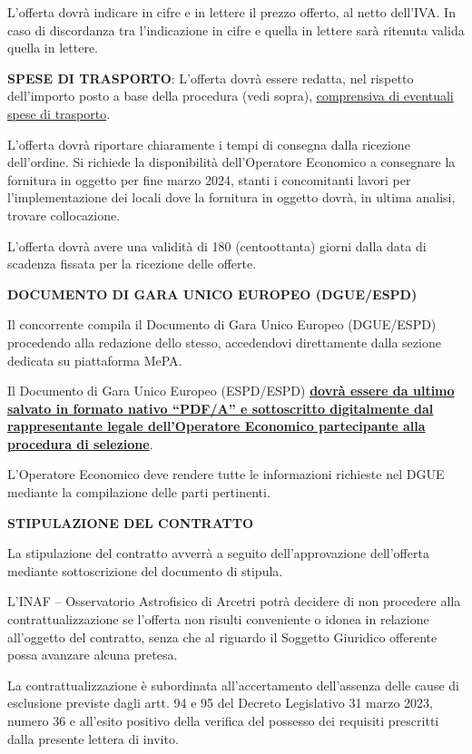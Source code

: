 \documentclass[a4paper,12pt]{letter}
\begin{document}
L'offerta dovrà indicare in cifre e in lettere il prezzo offerto, al netto dell’IVA. In caso di discordanza tra l’indicazione in cifre e quella in lettere sarà ritenuta valida quella in lettere.

\textbf{SPESE DI TRASPORTO}: L’offerta dovrà essere redatta, nel rispetto dell’importo posto a base della procedura (vedi sopra), \underline{comprensiva di eventuali spese di trasporto}.

L’offerta dovrà riportare chiaramente i tempi di consegna dalla ricezione dell’ordine. Si richiede la disponibilità dell’Operatore Economico a consegnare la fornitura in oggetto per fine marzo 2024, stanti i concomitanti lavori per l’implementazione dei locali dove la fornitura in oggetto dovrà, in ultima analisi, trovare collocazione.

L’offerta dovrà avere una validità di 180 (centoottanta) giorni dalla data di scadenza fissata per la ricezione delle offerte.

\textbf{DOCUMENTO DI GARA UNICO EUROPEO (DGUE/ESPD)}

Il concorrente compila il Documento di Gara Unico Europeo (DGUE/ESPD) procedendo alla redazione dello stesso, accedendovi direttamente dalla sezione dedicata su piattaforma MePA. 

Il Documento di Gara Unico Europeo (ESPD/ESPD) \textbf{\underline{dovrà essere da ultimo salvato in formato nativo “PDF/A” e sottoscritto digitalmente dal rappresentante legale dell’Operatore Economico partecipante alla procedura di selezione}}.

L’Operatore Economico deve rendere tutte le informazioni richieste nel DGUE mediante la compilazione delle parti pertinenti.

\textbf{STIPULAZIONE DEL CONTRATTO}

La stipulazione del contratto avverrà a seguito dell’approvazione dell’offerta mediante sottoscrizione del documento di stipula.

L’INAF – Osservatorio Astrofisico di Arcetri potrà decidere di non procedere alla contrattualizzazione se l’offerta non risulti conveniente o idonea in relazione all’oggetto del contratto, senza che al riguardo il Soggetto Giuridico offerente possa avanzare alcuna pretesa.

La contrattualizzazione è subordinata all’accertamento dell’assenza delle cause di esclusione previste dagli artt. 94 e 95 del Decreto Legislativo 31 marzo 2023, numero 36 e all’esito positivo della verifica del possesso dei requisiti prescritti dalla presente lettera di invito.
\end{document}
